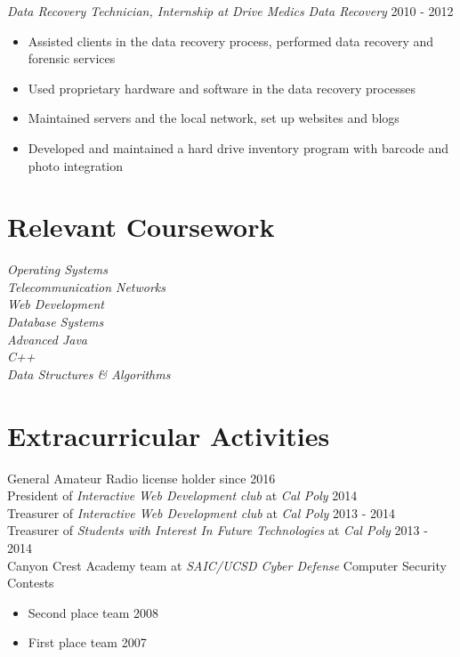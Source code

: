 \documentclass[line]{docs/resume/res}
\begin{document}
\begin{resume}
  {\sl Data Recovery Technician, Internship at Drive Medics Data Recovery} \hfill 2010 - 2012
  \begin{itemize} \itemsep -2pt
    \item Assisted clients in the data recovery process, performed data recovery and \\
      forensic services
    \item Used proprietary hardware and software in the data recovery processes
    \item Maintained servers and the local network, set up websites and blogs
    \item Developed and maintained a hard drive inventory program with barcode and \\
      photo integration
  \end{itemize}

\section{Relevant Coursework}
  {\sl Operating Systems } \\
  {\sl Telecommunication Networks } \\
  {\sl Web Development } \\
  {\sl Database Systems } \\
  {\sl Advanced Java} \\
  {\sl C++} \\
  {\sl Data Structures \& Algorithms}

\section{Extracurricular Activities}
  General Amateur Radio license holder since \hfill 2016 \\
  President of {\it Interactive Web Development club} at {\it Cal Poly} \hfill 2014 \\
  Treasurer of {\it Interactive Web Development club} at {\it Cal Poly} \hfill 2013 - 2014 \\
  Treasurer of {\it Students with Interest In Future Technologies} at {\it Cal Poly} \hfill 2013 - 2014 \\
  Canyon Crest Academy team at {\it SAIC/UCSD Cyber Defense} Computer Security Contests
  \begin{itemize} \itemsep -2pt
    \item Second place team \hfill 2008
    \item First place team \hfill 2007
  \end{itemize}

\end{resume}
\end{document}
